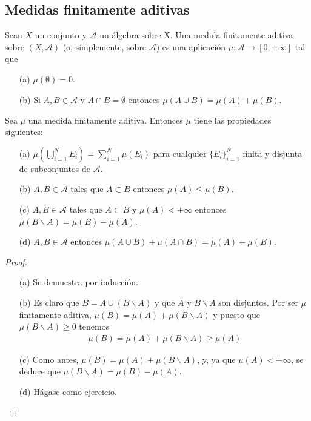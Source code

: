 \subsection{Medidas finitamente aditivas}
\begin{defi}
Sean $X$ un conjunto y $\mathcal{A}$ un álgebra sobre X. Una medida finitamente aditiva sobre $(X, \mathcal{A})$ (o, simplemente, sobre $\mathcal{A}$) es una aplicación $\mu : \mathcal{A} \longrightarrow [0, +\infty]$ tal que
\begin{enumerate}
    \item[(a)] $\mu (\emptyset) = 0$.
    \item[(b)] Si $A, B \in \mathcal{A}$ y $A \cap B = \emptyset$ entonces $\mu(A \cup B) = \mu(A) + \mu(B)$.
\end{enumerate}
\end{defi}
\begin{prop}
Sea $\mu$ una medida finitamente aditiva. Entonces $\mu$ tiene las propiedades siguientes:
\begin{enumerate}
    \item[(a)] $\mu \left(\bigcup_{i=1}^{N}{E_i} \right) = \sum_{i=1}^{N} \mu(E_i)$ para cualquier $\{ E_i \}_{i=1}^{N}$ finita y disjunta de subconjuntos de $\mathcal{A}$.
    \item[(b)] $A, B \in \mathcal{A}$ tales que $A \subset B$ entonces $\mu(A) \leq \mu(B)$.
    \item[(c)] $A, B \in \mathcal{A}$ tales que $A \subset B$ y $\mu(A) < +\infty$ entonces $\mu(B \backslash A) = \mu(B) - \mu(A)$.
    \item[(d)] $A, B \in \mathcal{A}$ entonces $\mu(A \cup B) + \mu(A \cap B) = \mu(A) + \mu(B)$.
\end{enumerate}
\end{prop}
\begin{proof}
\begin{enumerate}
    \item[(a)] Se demuestra por inducción.
    \item[(b)] Es claro que $B = A \cup (B \backslash A)$ y que $A$ y $B \backslash A$ son disjuntos. Por ser $\mu$ finitamente aditiva, $\mu(B) = \mu(A) + \mu(B \backslash A)$ y puesto que $\mu(B \backslash A) \ge 0$ tenemos
    \begin{align*}
        \mu(B) = \mu(A) + \mu(B \backslash A) \ge \mu(A)
    \end{align*}
    \item[(c)] Como antes, $\mu(B) = \mu(A) + \mu(B \backslash A)$, y, ya que $\mu(A) < +\infty$, se deduce que $\mu(B \backslash A) = \mu(B) - \mu(A)$.
    \item[(d)] Hágase como ejercicio.
\end{enumerate}
\end{proof}

